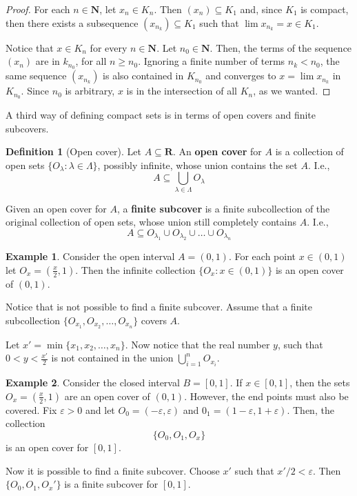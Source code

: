 \documentclass[12pt,a4paper]{article}
\theoremstyle{definition}
\newtheorem{example}{Example}[section]
\newtheorem{definition}{Definition}[section]
\begin{document}
\begin{proof}
	For each $n \in \textbf{N}$, let $x_n \in K_n$. Then $(x_n) \subseteq K_1$ and, since $K_1$ is compact, then there exists a subsequence $(x_{n_k}) \subseteq K_1$ such that $\lim x_{n_k} = x \in K_1$.
	
	Notice that $x \in K_n$ for every $n \in \textbf{N}$. Let $n_0 \in \textbf{N}$. Then, the terms of the sequence $(x_n)$ are in $k_{n_0}$, for all $n \geq n_0$. Ignoring a finite number of terms $n_k < n_0$, the same sequence $(x_{n_k})$ is also contained in $K_{n_0}$ and converges to $x = \lim x_{n_k}$ in $K_{n_0}$. Since $n_0$ is arbitrary, $x$ is in the intersection of all $K_n$, as we wanted. 
\end{proof}

A third way of defining compact sets is in terms of open covers and finite subcovers. 

\begin{definition}[Open cover]
	Let $A \subseteq \textbf{R}$. An \textbf{open cover} for $A$ is a collection of open sets $\{ O_\lambda : \lambda \in \Lambda \}$, possibly infinite, whose union contains the set $A$. I.e.,
	\[
		A \subseteq \bigcup_{\lambda \in \Lambda} O_\lambda
	\]
	
	Given an open cover for $A$, a \textbf{finite subcover} is a finite subcollection of the original collection of open sets, whose union still completely contains $A$. I.e.,
	\[
		A \subseteq O_{\lambda_1} \cup O_{\lambda_2} \cup \ldots \cup O_{\lambda_n} 
	\]
\end{definition}

\begin{example}
	Consider the open interval $A = (0,1)$. For each point $x \in (0,1)$ let $O_x = \left( \frac{x}{2}, 1 \right)$. Then the infinite collection $\{ O_x : x \in (0,1) \}$ is an open cover of $(0,1)$.
	
	Notice that is not possible to find a finite subcover. Assume that a finite subcollection $\{ O_{x_1}, O_{x_2}, \ldots , O_{x_n} \}$ covers $A$.
	
	Let $x' = \min \{ x_1, x_2, \ldots, x_n \}$. Now notice that the real number $y$, such that $0 < y < \frac{x'}{2}$ is not contained in the union $\bigcup_{i=1}^n O_{x_i}$. 
\end{example}

\begin{example}
	Consider the closed interval $B = [0,1]$. If $x \in [0,1]$, then the sets $O_x = \left( \frac{x}{2}, 1 \right)$ are an open cover of $(0,1)$. However, the end points must also be covered. Fix $\varepsilon > 0$ and let $O_0 = (-\varepsilon, \varepsilon)$ and $0_1 = (1-\varepsilon, 1+\varepsilon)$. Then, the collection
	\[
		\{ O_0, O_1, O_x \}
	\]
	is an open cover for $[0,1]$.
	
	Now it is possible to find a finite subcover. Choose $x'$ such that $x'/2 < \varepsilon$. Then $\{ O_0, O_1, O_x' \}$ is a finite subcover for $[0,1]$.
\end{example}
\end{document}

